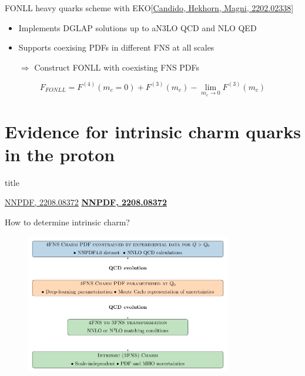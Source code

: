 \documentclass[aspectratio=43, 8pt,t]{beamer}
\newcommand{\SectionTitleFrame}[1][]{%
  \begin{frame}
    \vfill
    \centering
    \begin{beamercolorbox}[sep=8pt,center,shadow=true,rounded=true]{title}
      \usebeamerfont{title}\insertsection\par
    \end{beamercolorbox}
    \ifx\relax#1\relax\else
      \vspace{0.5cm}
      \textbf{#1}
    \fi
    \vfill
  \end{frame}
}
\begin{document}
\begin{frame}{FONLL heavy quarks scheme with EKO}{\color{gray}\footnotesize [\hyperlink{https://arxiv.org/abs/2202.02338}{Candido, Hekhorn, Magni, 2202.02338}]}
\begin{figure}
  \end{figure}
  \begin{itemize}
    \item Implements DGLAP solutions up to aN3LO QCD and NLO QED
    \item Supports coexising PDFs in different FNS at all scales
    \item[$\Rightarrow$] Construct FONLL with coexisting FNS PDFs
  \end{itemize}

  $$F_{FONLL} = F^{(4)}(m_c=0) + F^{(3)}(m_c) - \lim_{m_c\rightarrow 0} F^{(3)}(m_c)$$
\end{frame}


\section*{Evidence for intrinsic charm quarks in the proton}
\SectionTitleFrame[\hyperlink{https://arxiv.org/abs/2208.08372}{NNPDF, 2208.08372}]

\begin{frame}{How to determine intrinsic charm?}
  \begin{figure}
    \includegraphics[width=0.8\textwidth]{strategy.pdf}
  \end{figure}

\end{frame}
\end{document}
